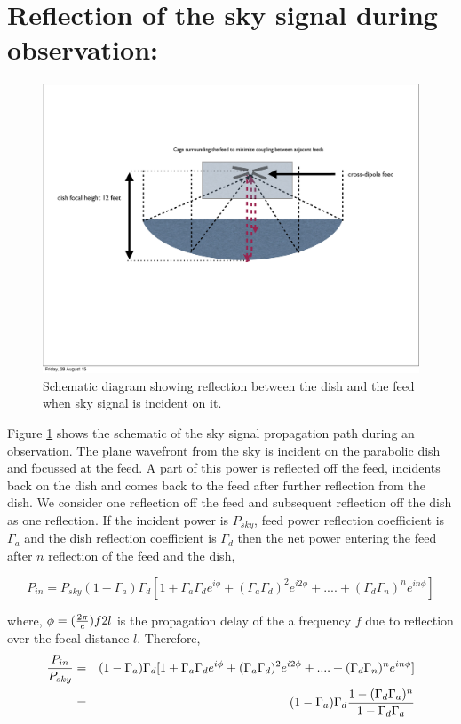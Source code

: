 \documentclass[12pt,preprint]{aastex}
\begin{document}
\section{Reflection of the sky signal during observation:}

\begin{figure}
\centering
\includegraphics[totalheight=0.5\textheight]{schematic.pdf}
\caption{Schematic diagram showing reflection between the dish and the feed when sky signal is incident on it. }
\label{reflection_schematic}
\end{figure}
Figure \ref{reflection_schematic} shows the schematic of the sky signal propagation path during an observation. The plane wavefront from the sky is incident on the parabolic dish and focussed at the feed. A part of this power is reflected off the feed, incidents back on the dish and comes back to the feed after further reflection from the dish. We consider one reflection off the feed and subsequent reflection off the dish as one reflection. If the incident power is $P_{sky}$, feed power reflection coefficient is $\Gamma_{a}$ and the dish reflection coefficient is $\Gamma_{d}$ then the net power entering the feed after $n$ reflection of the feed and the dish,  

\begin{equation}
P_{in} =  P_{sky}(1-\Gamma_{a})\Gamma_{d} [1+ \Gamma_{a}\Gamma_{d} e^{i\phi}+ (\Gamma_{a}\Gamma_{d})^2e^{i2\phi}+ ....+ (\Gamma_{d}\Gamma_{n})^{n}e^{in\phi}]
\end{equation}

where, $\phi = ({2\pi \over c})f 2l$ is the propagation delay of the a frequency $f$ due to reflection over the focal distance $l$. 
Therefore, 
\begin{eqnarray}
{P_{in} \over P_{sky} } & = & (1-\Gamma_{a})\Gamma_{d} [1+ \Gamma_{a}\Gamma_{d} e^{i\phi}+ (\Gamma_{a}\Gamma_{d})^2e^{i2\phi}+ ....+ (\Gamma_{d}\Gamma_{n})^{n}e^{in\phi}] \nonumber\\
      & = & (1-\Gamma_{a})\Gamma_{d} {1-(\Gamma_{d}\Gamma_{a})^{n} \over 1-\Gamma_{d} \Gamma_{a} } 
\end{eqnarray}
\end{document}
